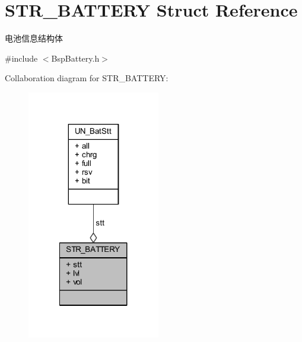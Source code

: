 \hypertarget{struct_s_t_r___b_a_t_t_e_r_y}{\section{\-S\-T\-R\-\_\-\-B\-A\-T\-T\-E\-R\-Y \-Struct \-Reference}
\label{struct_s_t_r___b_a_t_t_e_r_y}
}


电池信息结构体  




{\ttfamily \#include $<$\-Bsp\-Battery.\-h$>$}



\-Collaboration diagram for \-S\-T\-R\-\_\-\-B\-A\-T\-T\-E\-R\-Y\-:\nopagebreak
\begin{figure}[H]
\begin{center}
\leavevmode
\includegraphics[width=164pt]{struct_s_t_r___b_a_t_t_e_r_y__coll__graph}
\end{center}
\end{figure}
